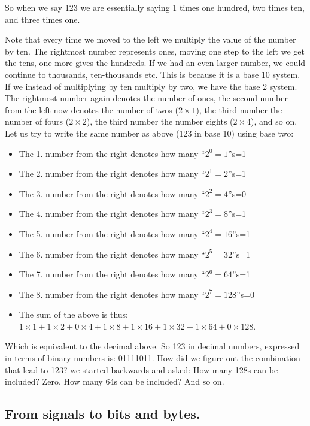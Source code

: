\documentclass[]{book}
\providecommand{\tightlist}{%
  \setlength{\itemsep}{0pt}\setlength{\parskip}{0pt}}
\begin{document}
So when we say 123 we are essentially saying 1 times one hundred, two times ten, and three times one.

Note that every time we moved to the left we multiply the value of the number by ten. The rightmost number represents ones, moving one step to the left we get the tens, one more gives the hundreds. If we had an even larger number, we could continue to thousands, ten-thousands etc. This is because it is a base 10 system. If we instead of multiplying by ten multiply by two, we have the base 2 system. The rightmost number again denotes the number of ones, the second number from the left now denotes the number of twos (\(2\times 1\)), the third number the number of fours (\(2\times 2\)), the third number the number eights (\(2\times 4\)), and so on. Let us try to write the same number as above (123 in base 10) using base two:

\begin{itemize}
\tightlist
\item
  The 1. number from the right denotes how many ``\(2^0=1\)''s=1
\item
  The 2. number from the right denotes how many ``\(2^1=2\)''s=1
\item
  The 3. number from the right denotes how many ``\(2^2=4\)''s=0
\item
  The 4. number from the right denotes how many ``\(2^3=8\)''s=1
\item
  The 5. number from the right denotes how many ``\(2^4=16\)''s=1
\item
  The 6. number from the right denotes how many ``\(2^5=32\)''s=1
\item
  The 7. number from the right denotes how many ``\(2^6=64\)''s=1
\item
  The 8. number from the right denotes how many ``\(2^7=128\)''s=0
\item
  The sum of the above is thus: \(1 \times 1+1\times 2+0\times 4 +1\times 8 +1\times 16 +1\times 32 +1\times 64 +0\times 128.\)
\end{itemize}

Which is equivalent to the decimal above. So 123 in decimal numbers, expressed in terms of binary numbers is: 01111011. How did we figure out the combination that lead to 123? we started backwards and asked: How many 128s can be included? Zero. How many 64s can be included? And so on.

\hypertarget{from-signals-to-bits-and-bytes.}{%
\subsection{From signals to bits and bytes.}\label{from-signals-to-bits-and-bytes.}}
\end{document}

